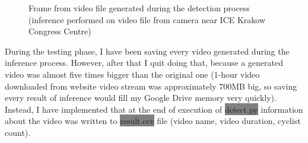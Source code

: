 \begin{figure} [H]
    \centering
    \caption{Frame from video file generated during the detection process (inference performed on video file from camera near ICE Krakow Congress Centre)}
    \label{fig:inference5}
\end{figure}
During the testing phase, I have been saving every video generated during the inference process. However, after that I quit doing that, because a generated video was almost five times bigger than the original one (1-hour video downloaded from website video stream was approximately 700MB big, so saving every result of inference would fill my Google Drive memory very quickly). Instead, I have implemented that at the end of execution of \colorbox{Gray}{detect.py} information about the video was written to \colorbox{Gray}{result.csv} file (video name, video duration, cyclist count).